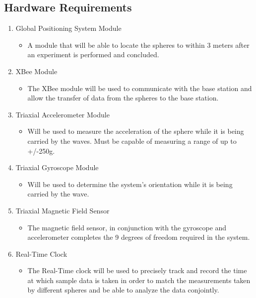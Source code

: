\subsection{Hardware Requirements}
\begin{enumerate}
 
\item Global Positioning System Module
\begin{itemize}
\item A module that will be able to locate the spheres to within 3 meters after an experiment is performed and concluded.  
\end{itemize}

\item  XBee Module
\begin{itemize}
\item The XBee module will be used to communicate with the base station and allow the transfer of data from the spheres to the base station.
\end{itemize}

\item  Triaxial Accelerometer Module
\begin{itemize}
\item Will be used to measure the acceleration of the sphere while it is being carried by the waves.  Must be capable of measuring a range of up to +/-250g.
\end{itemize}

\item Triaxial Gyroscope Module
\begin{itemize}
\item Will be used to determine the system's orientation while it is being carried by the wave.   
\end{itemize}

\item Triaxial Magnetic Field Sensor
\begin{itemize}
\item The magnetic field sensor, in conjunction with the gyroscope and accelerometer completes the 9 degrees of freedom required in the system.
\end{itemize}

\item  Real-Time Clock
\begin{itemize}
\item The Real-Time clock will be used to precisely track and record the time at which sample data is taken in order to match the measurements taken by different spheres and be able to analyze the data conjointly.
\end{itemize}


\end{enumerate}
